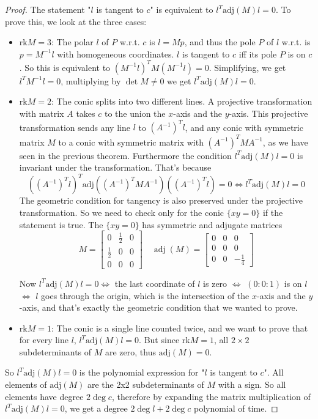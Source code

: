 \documentclass[a4paper]{article}
\begin{document}
\begin{proof}
    The statement "$l$ is tangent to $c$" is equivalent to $l^T\mathrm{adj}(M) l=0$. To prove this, we look at the three cases:

    \begin{itemize}
    \item $\mathrm{rk}M=3$: The polar $l$ of $P$ w.r.t. $c$ is $l=Mp$, and thus the pole $P$ of $l$ w.r.t. is $p=M^{-1}l$ with homogeneous coordinates. $l$ is tangent to $c$ iff its pole $P$ is on $c$. So this is equivalent to $(M^{-1}l)^TM(M^{-1}l)=0$. Simplifying, we get $l^TM^{-1}l=0$, multiplying by $\det M\ne0$ we get $l^T\mathrm{adj}(M) l=0$.
    \item $\mathrm{rk}M=2$: The conic splits into two different lines. A projective transformation with matrix $A$ takes $c$ to the union the $x$-axis and the $y$-axis. This projective transformation sends any line $l$ to $(A^{-1})^Tl$, and any conic with symmetric matrix $M$ to a conic with symmetric matrix with $(A^{-1})^TMA^{-1}$, as we have seen in the previous theorem. Furthermore the condition $l^T\mathrm{adj}(M) l=0$ is invariant under the transformation. That's because
    $$((A^{-1})^Tl)^T\mathrm{adj}((A^{-1})^TMA^{-1})((A^{-1})^Tl)=0\iff l^T\mathrm{adj}(M) l=0$$
    The geometric condition for tangency is also preserved under the projective transformation.
    So we need to check only for the conic $\{xy=0\}$ if the statement is true. The $\{xy=0\}$ has symmetric and adjugate matrices
    $$M =
\begin{bmatrix}
0 & \tfrac{1}{2} & 0\\[4pt]
\tfrac{1}{2} & 0 & 0\\[4pt]
0 & 0 & 0
\end{bmatrix}
\quad
\operatorname{adj}(M) =
\begin{bmatrix}
0 & 0 & 0\\[4pt]
0 & 0 & 0\\[4pt]
0 & 0 & -\tfrac{1}{4}
\end{bmatrix}$$

Now
$l^T\mathrm{adj}(M) l=0 \iff$ the last coordinate of $l$ is zero $\iff$ $(0:0:1)$ is on $l$ $\iff$ $l$ goes through the origin, which is the intersection of the $x$-axis and the $y$-axis, and that's exactly the geometric condition that we wanted to prove.


    \item $\mathrm{rk}M=1$: The conic is a single line counted twice, and we want to prove that for every line $l$, $l^T\mathrm{adj}(M) l=0$. But since $\mathrm{rk}M=1$, all $2\times 2$ subdeterminants of $M$ are zero, thus $\mathrm{adj}(M)=0$.
\end{itemize}

    So $l^T\mathrm{adj}(M) l=0$ is the polynomial expression for "$l$ is tangent to $c$". All elements of $\mathrm{adj}(M)$ are the 2x2 subdeterminants of $M$ with a sign. So all elements have degree $2\deg c$, therefore by expanding the matrix multiplication of $l^T\mathrm{adj}(M) l=0$, we get a degree $2\deg l+ 2\deg c$ polynomial of time.
\end{proof}
\end{document}
